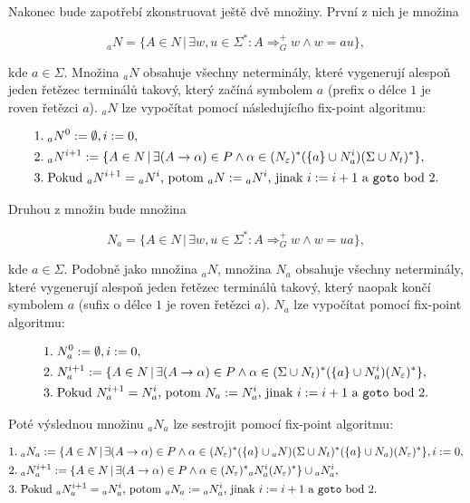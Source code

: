 \documentclass[a4paper, 12pt]{article}
\theoremstyle{definition}
\theoremstyle{definition}
\theoremstyle{definition}
\theoremstyle{remark}
\begin{document}
Nakonec bude zapotřebí zkonstruovat ještě dvě množiny. První z nich je množina

$${}_{a}N = \{A \in N \, | \, \exists w, u \in \Sigma^\ast : A \Rightarrow_G^+ w \wedge  w = au\},$$

\noindent
kde $a \in \Sigma$. Množina ${}_{a}N$ obsahuje všechny neterminály, které vygenerují alespoň jeden řetězec terminálů takový, který začíná symbolem $a$ (prefix o délce $1$ je roven řetězci $a$). ${}_{a}N$ lze vypočítat pomocí následujícího fix-point algoritmu:

\begin{align*}
    &1. \; {}_{a}N^0 := \emptyset, i := 0, \\
    &2. \; {}_{a}N^{i+1} := \{A \in N \, | \, \exists (A \rightarrow \alpha) \in P \wedge \alpha \in (N_{\varepsilon})^\ast(\{a\} \cup N_a^i)(\Sigma \cup N_t)^\ast\}, \\
    &3. \; \text{Pokud } {}_{a}N^{i+1} = {}_{a}N^i \text{, potom } {}_{a}N := {}_{a}N^i \text{, jinak } i := i+1 \text{ a \texttt{goto} bod 2}.
\end{align*}

Druhou z množin bude množina

$$N_a = \{A \in N \, | \, \exists w, u \in \Sigma^\ast : A \Rightarrow_G^+ w \wedge  w = ua\},$$

\noindent
kde $a \in \Sigma$. Podobně jako množina ${}_{a}N$, množina $N_a$ obsahuje všechny neterminály, které vygenerují alespoň jeden řetězec terminálů takový, který naopak končí symbolem $a$ (sufix o délce $1$ je roven řetězci $a$). $N_a$ lze vypočítat pomocí fix-point algoritmu:

\begin{align*}
    &1. \; N_a^0 := \emptyset, i := 0, \\
    &2. \; N_a^{i+1} := \{A \in N \, | \, \exists (A \rightarrow \alpha) \in P \wedge \alpha \in (\Sigma \cup N_t)^\ast(\{a\} \cup N_a^i)(N_{\varepsilon})^\ast\}, \\
    &3. \; \text{Pokud } N_a^{i+1} = N_a^i \text{, potom } N_a := N_a^i \text{, jinak } i := i+1 \text{ a \texttt{goto} bod 2}.
\end{align*}

Poté výslednou množinu ${}_{a}N_{a}$ lze sestrojit pomocí fix-point algoritmu:

\begin{align*}
    &1. \; {}_{a}N_{a} := \{A \in N \, | \, \exists (A \rightarrow \alpha) \in P \wedge \alpha \in (N_{\varepsilon})^\ast(\{a\} \cup {}_{a}N)(\Sigma \cup N_t)^\ast(\{a\} \cup N_a)(N_{\varepsilon})^\ast\}, i := 0, \\
    &2. \; {}_{a}N_{a}^{i+1} := \{A \in N \, | \, \exists (A \rightarrow \alpha) \in P \wedge \alpha \in (N_{\varepsilon})^\ast{}_{a}N_{a}^i(N_{\varepsilon})^\ast\} \cup {}_{a}N_{a}^i, \\
    &3. \; \text{Pokud } {}_{a}N_{a}^{i+1} = {}_{a}N_{a}^i \text{, potom } {}_{a}N_{a} := {}_{a}N_{a}^i \text{, jinak } i := i+1 \text{ a \texttt{goto} bod 2}.
\end{align*}
\end{document}
